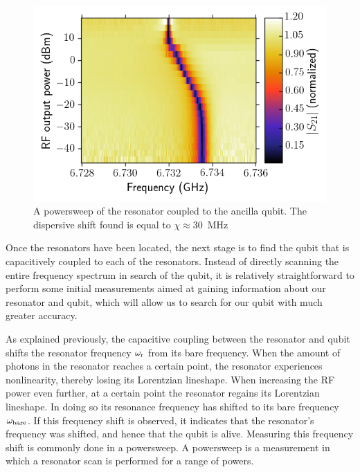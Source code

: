         \begin{figure}
          \begin{center}
          \vspace{-30pt}
            \includegraphics[width=\textwidth]{../Figures/Qubit characterization/Powersweep.png}
          \end{center}
          \vspace{-20 pt}
          \caption{A powersweep of the resonator coupled to the ancilla qubit. The dispersive shift found is equal to $\chi\approx$\SI{30}{\mega \hertz}}
          \label{fig:powersweep}
        \end{figure}


        Once the resonators have been located, the next stage is to find the qubit that is capacitively coupled to each of the resonators. Instead of directly scanning the entire frequency spectrum in search of the qubit, it is relatively straightforward to perform some initial measurements aimed at gaining information about our resonator and qubit, which will allow us to search for our qubit with much greater accuracy.

        As explained previously, the capacitive coupling between the resonator and qubit shifts the resonator frequency $\omega_\text{r}$ from its bare frequency. When the amount of photons in the resonator reaches a certain point, the resonator experiences nonlinearity, thereby losing its Lorentzian lineshape. When increasing the RF power even further, at a certain point the resonator regains its Lorentzian lineshape. In doing so its resonance frequency has shifted to its bare frequency $\omega_\text{bare}$. If this frequency shift is observed, it indicates that the resonator's frequency was shifted, and hence that the qubit is alive. Measuring this frequency shift is commonly done in a powersweep. A powersweep is a measurement in which a resonator scan is performed for a range of powers.


